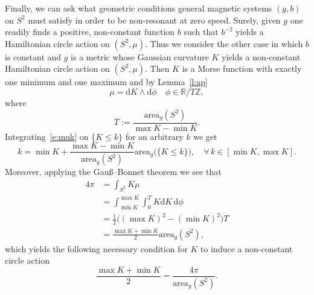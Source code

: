 \documentclass[AHL,Unicode,longabstracts,published]{cedram}
\newcommand{\Z}{\mathbb{Z}}
\newcommand{\R}{\mathbb{R}}
\newcommand{\diff}{\mathrm{d}}
\newcommand{\area}{\mathrm{area}}
\let\oldforall\forall
\renewcommand*{\forall}{\mathrel{\oldforall}}
\begin{document}
Finally, we can ask what geometric conditions general magnetic systems $(g,b)$ on $S^2$ must satisfy in order to be non-resonant at zero speed. Surely, given $g$ one readily finds a positive, non-constant function $b$ such that $b^{-2}$ yields a Hamiltonian circle action on $(S^2,\mu)$. Thus we consider the other case in which $b$ is constant and $g$ is a metric whose Gaussian curvature $K$ yields a non-constant Hamiltonian circle action on $(S^2,\mu)$. Then $K$ is a Morse function with exactly one minimum and one maximum and by Lemma~\ref{l:ap}
\begin{equation}\label{e:muk}
\mu=\diff K\wedge \diff\phi\quad \phi\in\R/T\Z,
\end{equation}
where
\[
T:=\frac{\area_g(S^2)}{\max K-\min K}.
\]
Integrating~\eqref{e:muk} on $\{K\leq k\}$ for an arbitrary $k$ we get
\begin{equation}\label{e:Kres0}
k=\min K+\frac{\max K-\min K}{\area_g(S^2)}\area_g\big(\{K\leq k\}\big),\quad \forall\,k\in[\min K,\max K].
\end{equation}
Moreover, applying the Gau\ss--Bonnet theorem we see that
\begin{align*}
4\pi&=\int_{S^2}K\mu\\
&=\int_{\min K}^{\max K}\int_0^TK\diff K\,\diff\phi\\
&=\frac12\big((\max K)^2-(\min K)^2\big)T\\
&=\frac{\max K+\min K}{2}\area_g(S^2),
\end{align*}
which yields the following necessary condition for $K$ to induce a non-constant circle action
\begin{equation}\label{e:Kres}
\frac{\max K+\min K}{2}=\frac{4\pi}{\area_g(S^2)}.
\end{equation}




\end{document}
